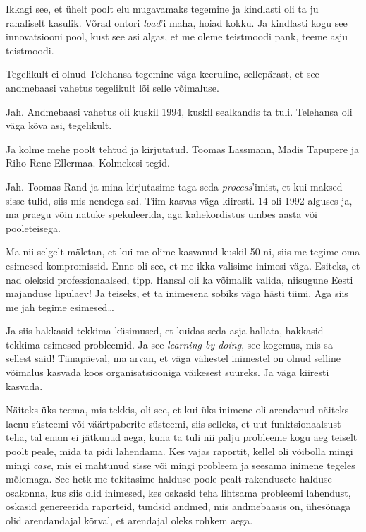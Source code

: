 Ikkagi see, et ühelt poolt elu mugavamaks tegemine ja kindlasti oli ta ju rahaliselt kasulik. Võrad ontori \emph{load}'i maha, hoiad kokku. Ja kindlasti kogu see innovatsiooni pool, kust see asi algas, et me oleme teistmoodi pank, teeme asju teistmoodi. 


Tegelikult ei olnud Telehansa tegemine väga keeruline, sellepärast, et see andmebaasi vahetus tegelikult lõi selle võimaluse. 


Jah. Andmebaasi vahetus oli  kuskil 1994, kuskil sealkandis ta tuli. Telehansa oli väga kõva asi, tegelikult.


Ja kolme mehe poolt tehtud ja kirjutatud. Toomas Lassmann, Madis Tapupere ja Riho-Rene Ellermaa. Kolmekesi tegid. 


Jah. Toomas Rand ja mina  kirjutasime taga seda \emph{process}'imist, et kui maksed sisse tulid, siis mis nendega sai. Tiim kasvas väga kiiresti. 14 oli 1992 alguses ja, ma praegu võin natuke spekuleerida, aga kahekordistus umbes aasta või pooleteisega. 


Ma nii selgelt mäletan, et kui me olime kasvanud kuskil 50-ni, siis me tegime oma esimesed kompromissid. Enne oli see, et me ikka valisime inimesi väga. Esiteks, et nad oleksid professionaalsed, tipp. Hansal oli ka võimalik valida, niisugune Eesti majanduse lipulaev! Ja teiseks, et ta inimesena sobiks väga hästi tiimi. Aga siis me jah tegime esimesed\ldots

Ja siis hakkasid tekkima küsimused,  et kuidas seda asja hallata, hakkasid tekkima esimesed probleemid. Ja see \emph{learning by doing}, see kogemus, mis sa sellest said! Tänapäeval, ma arvan, et väga vähestel inimestel on olnud selline võimalus kasvada koos organisatsiooniga väikesest suureks. Ja väga kiiresti kasvada. 

Näiteks üks teema, mis tekkis, oli see, et kui üks inimene oli arendanud näiteks laenu süsteemi või väärtpaberite süsteemi, siis selleks, et uut funktsionaalsust teha, tal enam ei jätkunud aega, kuna ta tuli nii palju probleeme kogu aeg teiselt poolt peale, mida ta pidi lahendama. Kes vajas raportit, kellel oli võibolla mingi mingi \emph{case},  mis ei mahtunud sisse või mingi  probleem ja seesama inimene tegeles mõlemaga. See hetk me  tekitasime halduse poole pealt rakendusete halduse osakonna, kus siis olid inimesed, kes oskasid teha lihtsama probleemi lahendust, oskasid genereerida raporteid, tundsid andmed, mis andmebaasis on, ühesõnaga olid arendandajal kõrval, et arendajal oleks rohkem aega. 

